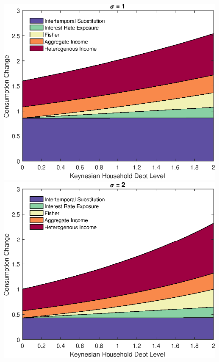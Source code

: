 \documentclass[titlepage]{\econtex}\newcommand{\texname}{ConsumptionHeterogeneity}
\begin{document}
\begin{figure} 
	\begin{centering}
		\includegraphics[scale=0.4]{../Matlab/DynareCode/Figures/KeynesianDebt_sigma1.eps}
		\includegraphics[scale=0.4]{../Matlab/DynareCode/Figures/KeynesianDebt_sigma2.eps}

\end{centering}
\end{figure}
\end{document}

